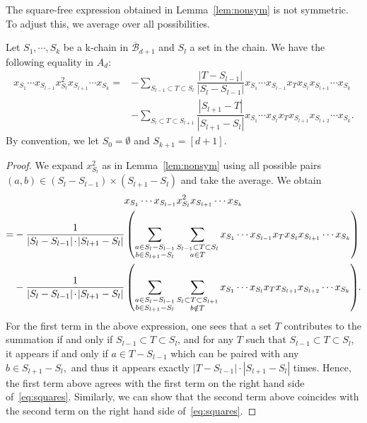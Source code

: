 \documentclass[ALCO,ThmDefs,Unicode,epreuves]{cedram}
\newcommand{\hB}{\overline{\mathcal B}}
\newcommand*{\Mk}{\mkern -2mu}
\begin{document}
The square-free expression obtained in Lemma~\ref{lem:nonsym} is not symmetric. To adjust this, we average over all possibilities.
\begin{lemm}\label{lem:squares}
	Let $S_1,\cdots,S_k$ be a k-chain in $\hB_{d+1}$ and $S_l$ a set in the chain. We have the following equality in $A_d$:
	\begin{align}
	x_{S_1}\cdots x_{S_{l-1}}x_{S_l}^2x_{S_{l+1}}\cdots x_{S_k} =& -\sum_{S_{l-1}\subset T\subset S_l} \dfrac{|T-S_{l-1}|}{|S_l-S_{l-1}|} x_{S_1}\cdots x_{S_{l-1}}x_Tx_{S_l}x_{S_{l+1}}\cdots x_{S_k} \label{eq:squares}\\
	& -\sum_{S_{l}\subset T\subset S_{l+1}} \dfrac{|S_{l+1}-T|}{|S_{l+1}-S_{l}|} x_{S_1}\cdots x_{S_{l}}x_Tx_{S_{l+1}}x_{S_{l+2}}\cdots x_{S_k}.\nonumber
	\end{align}
	By convention, we let $S_0=\emptyset$ and $S_{k+1}=[d+1]$.
\end{lemm}
\begin{proof}
	We expand $x_{S_l}^2$ as in Lemma~\ref{lem:nonsym} using all possible pairs $(a,b)\in (S_{l}-S_{l-1})\times (S_{l+1}-S_{l})$ and take the average. We obtain
\begin{multline*}
	 x_{S_1}\cdots x_{S_{l-1}}x_{S_l}^2x_{S_{l+1}}\cdots x_{S_k} \\
	\begin{aligned}
	=& -\frac{1}{|S_l-S_{l-1}|\Mk\cdot\Mk |S_{l+1}-S_l|} \left( \sum_{\substack{a \in S_l- S_{l-1} \\ 
	b \in S_{l+1}-S_l}} \sum_{\substack{S_{l-1}\subset T\subset S_{l} \\ a\in T}} x_{S_1}\cdots x_{S_{l-1}}x_Tx_{S_l}x_{S_{l+1}}\cdots x_{S_k}\right) \\
	& - \frac{1}{|S_l-S_{l-1}|\Mk\cdot\Mk |S_{l+1}-S_l|} \left(\sum_{\substack{a \in S_l- S_{l-1} \\ 
	b \in S_{l+1}-S_l}} \sum_{\substack{S_l\subset T\subset S_{l+1} \\ 
	b\notin T}} x_{S_1}\cdots x_{S_{l}}x_Tx_{S_{l+1}}x_{S_{l+2}}\cdots x_{S_k} \right)\Mk\Mk.
	\end{aligned}
	\end{multline*}
	For the first term in the above expression, one sees that a set $T$ contributes to the summation if and only if $S_{l-1}\subset T\subset S_l$, and for any $T$ %
	such that $ S_{l-1}\subset T\subset S_l,$ it appears if and only if $a \in T-S_{l-1}$ which can be paired with any $b \in S_{l+1}-S_l,$ and thus it appears exactly $|T-S_{l-1}|\cdot |S_{l+1}-S_l|$ times. Hence, the first term above agrees with the first term on the right hand side of~\eqref{eq:squares}. Similarly, we can show that the second term above coincides with the second term on the right hand side of~\eqref{eq:squares}.
\end{proof}
\end{document}
